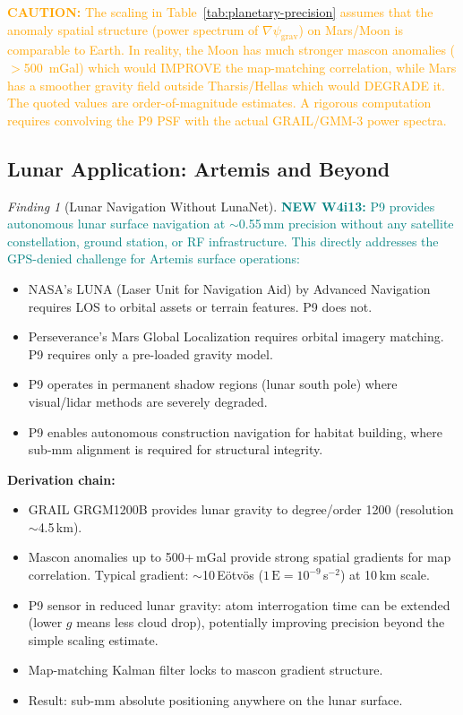 \documentclass[11pt]{article}
\theoremstyle{definition}
\theoremstyle{remark}
\newtheorem{finding}[theorem]{Finding}
\newcommand{\psigrav}{\psi_{\mathrm{grav}}}
\newcommand{\caution}[1]{\textcolor{orange}{\textbf{CAUTION:} #1}}
\newcommand{\newfinding}[1]{\textcolor{teal}{\textbf{NEW W4i13:} #1}}
\begin{document}
\caution{The scaling in Table~\ref{tab:planetary-precision} assumes that
the anomaly spatial structure (power spectrum of $\nabla\psigrav$) on
Mars/Moon is comparable to Earth. In reality, the Moon has much stronger
mascon anomalies ($>$500~mGal) which would IMPROVE the map-matching
correlation, while Mars has a smoother gravity field outside Tharsis/Hellas
which would DEGRADE it. The quoted values are order-of-magnitude estimates.
A rigorous computation requires convolving the P9 PSF with the actual
GRAIL/GMM-3 power spectra.}

\subsection{Lunar Application: Artemis and Beyond}

\begin{finding}[Lunar Navigation Without LunaNet]
\label{find:lunar-nav}
\newfinding{P9 provides autonomous lunar surface navigation at $\sim$0.55\,mm
precision without any satellite constellation, ground station, or RF
infrastructure. This directly addresses the GPS-denied challenge for
Artemis surface operations:}
\begin{itemize}[nosep]
\item NASA's LUNA (Laser Unit for Navigation Aid) by Advanced Navigation
  requires LOS to orbital assets or terrain features. P9 does not.
\item Perseverance's Mars Global Localization requires orbital imagery
  matching. P9 requires only a pre-loaded gravity model.
\item P9 operates in permanent shadow regions (lunar south pole) where
  visual/lidar methods are severely degraded.
\item P9 enables autonomous construction navigation for habitat building,
  where sub-mm alignment is required for structural integrity.
\end{itemize}

\textbf{Derivation chain:}
\begin{itemize}[nosep]
\item GRAIL GRGM1200B provides lunar gravity to degree/order 1200
  (resolution $\sim$4.5\,km).
\item Mascon anomalies up to 500+\,mGal provide strong spatial gradients
  for map correlation. Typical gradient: $\sim$10\,E\"otv\"os ($1\,\text{E}
  = 10^{-9}$\,s$^{-2}$) at 10\,km scale.
\item P9 sensor in reduced lunar gravity: atom interrogation time can be
  extended (lower $g$ means less cloud drop), potentially improving
  precision beyond the simple scaling estimate.
\item Map-matching Kalman filter locks to mascon gradient structure.
\item Result: sub-mm absolute positioning anywhere on the lunar surface.
\end{itemize}
\end{finding}
\end{document}
